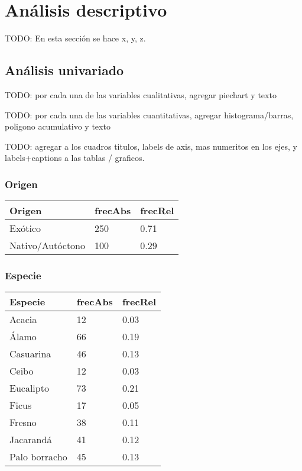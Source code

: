 \documentclass[titlepage, 12pt]{article}
\begin{document}
\newpage
\section{Análisis descriptivo}

TODO: En esta sección se hace x, y, z.

\subsection{Análisis univariado}

TODO: por cada una de las variables cualitativas, agregar piechart y texto

TODO: por cada una de las variables cuantitativas, agregar histograma/barras, poligono acumulativo y texto

TODO: agregar a los cuadros titulos, labels de axis, mas numeritos en los ejes, y labels+captions a las tablas / graficos.

\subsubsection{Origen}

\begin{table}[H]
  \begin{tabularx}{\textwidth}{|l|X|X|}
    \hline
    Origen           & frecAbs & frecRel \\ \hline
    Exótico          & 250     & 0.71    \\ \hline
    Nativo/Autóctono & 100     & 0.29    \\ \hline
  \end{tabularx}
\end{table}

\subsubsection{Especie}

\begin{table}[H]
  \begin{tabularx}{\textwidth}{|l|X|X|}
    \hline
    Especie       & frecAbs & frecRel \\ \hline
    Acacia        & 12      & 0.03    \\ \hline
    Álamo         & 66      & 0.19    \\ \hline
    Casuarina     & 46      & 0.13    \\ \hline
    Ceibo         & 12      & 0.03    \\ \hline
    Eucalipto     & 73      & 0.21    \\ \hline
    Ficus         & 17      & 0.05    \\ \hline
    Fresno        & 38      & 0.11    \\ \hline
    Jacarandá     & 41      & 0.12    \\ \hline
    Palo borracho & 45      & 0.13    \\ \hline
  \end{tabularx}
\end{table}
\end{document}
